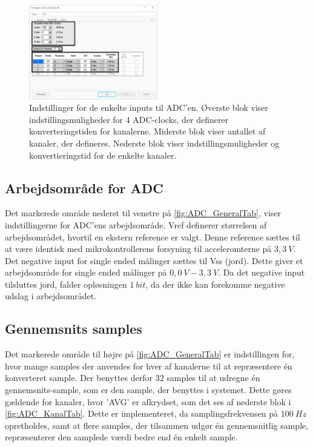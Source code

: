 \begin{figure}[H]
	\centering 
	\includegraphics[width=0.5\textwidth]{figures/ADC_instillinger2_edit.png}
	\caption{Indstillinger for de enkelte inputs til ADC'en. Øverste blok viser indstillingsmuligheder for 4 ADC-clocks, der definerer konverteringstiden for kanalerne. Miderste blok viser antallet af kanaler, der defineres. Nederste blok viser indstillingsmuligheder og konvertieringstid for de enkelte kanaler.}
	\label{fig:ADC_KanalTab}
\end{figure}

\subsection{Arbejdsområde for ADC}
Det markerede område nederst til venstre på \autoref{fig:ADC_GeneralTab}, viser indstillingerne for ADC'ens arbejdsområde. Vref definerer størrelsen af arbejdsområdet, hvortil en ekstern reference er valgt. Denne reference sættes til at være identisk med mikrokontrollerens forsyning til acceleromterne på $3,3~V$. Det negative input for single ended målinger sættes til Vss (jord). Dette giver et arbejdsområde for single ended målinger på $0,0~V - 3,3~V$. Da det negative input tilsluttes jord, falder opløsningen $1~bit$, da der ikke kan forekomme negative udslag i arbejdsområdet. 

\subsection{Gennemsnits samples}
Det markerede område til højre på \autoref{fig:ADC_GeneralTab} er indstillingen for, hvor mange samples der anvendes for hver af kanalerne til at repræsentere én konverteret sample. Der benyttes derfor 32 samples til at udregne én gennemsnits-sample, som er den sample, der benyttes i systemet. Dette gøres gældende for kanaler, hvor 'AVG' er afkrydset, som det ses af nederste blok i \autoref{fig:ADC_KanalTab}. Dette er implementeret, da samplingsfrekvensen på $100~Hz$ opretholdes, samt at flere samples, der tilsammen udgør én gennemsnitlig sample, repræsenterer den samplede værdi bedre end én enkelt sample. 





